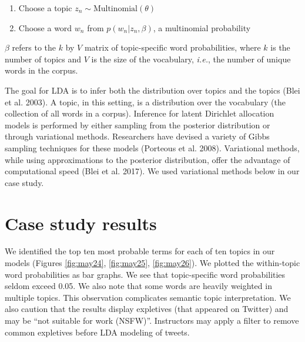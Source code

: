\documentclass[
]{article}
\providecommand{\tightlist}{%
  \setlength{\itemsep}{0pt}\setlength{\parskip}{0pt}}
\begin{document}
\begin{enumerate}
\def\labelenumi{\alph{enumi}.}
\tightlist
\item
  Choose a topic \(z_n \sim \text{Multinomial}(\theta)\)\\
\item
  Choose a word \(w_n\) from \(p(w_n | z_n, \beta)\), a multinomial probability
\end{enumerate}

\(\beta\) refers to the \(k\) by \(V\) matrix of topic-specific word probabilities, where \(k\)
is the number of topics and \(V\) is the size of the vocabulary, \emph{i.e.}, the number of unique words in the corpus.

The goal for LDA is to infer both the distribution over topics and
the topics (Blei et al. 2003). A topic, in this setting, is a distribution over
the vocabulary (the collection of all words in a corpus).
Inference for latent Dirichlet allocation models is performed by either
sampling from the posterior distribution or through variational methods. Researchers
have devised a variety of Gibbs sampling techniques for these models (Porteous et al. 2008).
Variational methods, while using approximations to the posterior distribution, offer the
advantage of computational speed (Blei et al. 2017). We used variational methods below in our case study.

\hypertarget{case-study-results}{%
\section{Case study results}\label{case-study-results}}

We identified the top ten most probable terms for each of ten topics in our models
(Figures \ref{fig:may24}, \ref{fig:may25}, \ref{fig:may26}).
We plotted the within-topic word probabilities as bar graphs. We see that topic-specific
word probabilities seldom exceed 0.05. We also note that some words are heavily weighted in
multiple topics. This observation complicates semantic topic interpretation. We
also caution that the results display expletives (that appeared on Twitter) and may be ``not suitable for work (NSFW)''.
Instructors may apply a filter to remove common expletives before LDA modeling of tweets.
\end{document}
